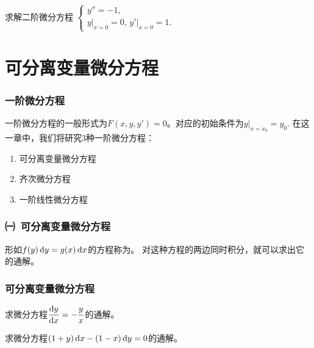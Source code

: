 \documentclass[14pt,notheorems,leqno,xcolor={rgb}]{beamer} %
\begin{document}
\begin{frame}
\begin{example}求解二阶微分方程
$\left\{\begin{array}{l}
y''=-1, \\
y\big|_{x=0}=0,\, y'\big|_{x=0}=1.
\end{array}\right.$
\end{example}
\pause
{}
\end{frame}

\section{可分离变量微分方程}

\begin{frame}
\frametitle{一阶微分方程}
一阶微分方程的一般形式为$F(x,y,y')=0$。对应的初始条件为$y|_{x=x_0}=y_0$.\vpause
在这一章中，我们将研究3种一阶微分方程：\pause
\begin{enumerate}[<+->]
  \item 可分离变量微分方程
  \item 齐次微分方程
  \item 一阶线性微分方程
\end{enumerate}
\end{frame}

\begin{frame}
\frametitle{㈠\ 可分离变量微分方程}
形如$f(y)\mathop{}\!\mathrm{d}{y}=g(x)\mathop{}\!\mathrm{d}{x}$的方程称为。
\ppause
对这种方程的两边同时积分，就可以求出它的通解。
\end{frame}

\begin{frame}
\frametitle{可分离变量微分方程}
\begin{example}
求微分方程$\dfrac{\mathop{}\!\mathrm{d}{y}}{\mathop{}\!\mathrm{d}{x}}=-\dfrac{y}{x}$的通解。
\end{example}
\pause
\begin{exercise}
求微分方程$(1+y)\mathop{}\!\mathrm{d}{x}-(1-x)\mathop{}\!\mathrm{d}{y}=0$的通解。
\end{exercise}
\end{frame}
\end{document}
